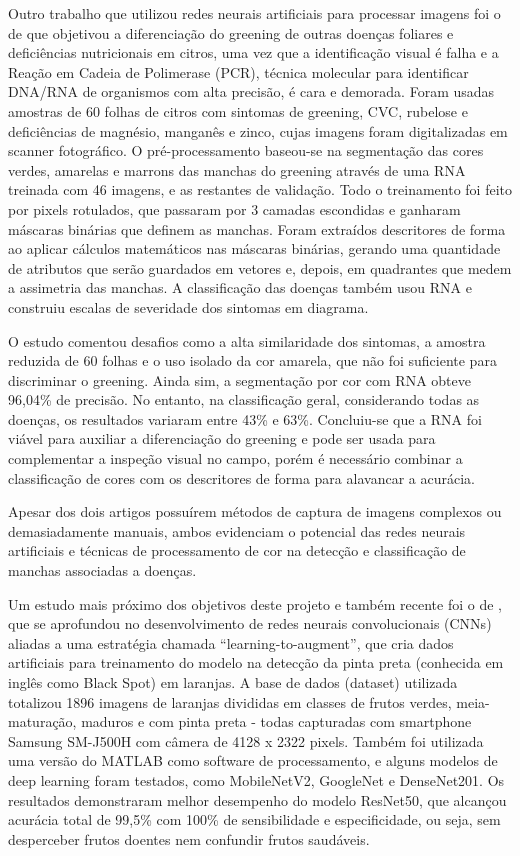 Outro trabalho que utilizou redes neurais artificiais para processar imagens foi o de \cite{Ribeiro2012} que objetivou a diferenciação do greening de outras doenças foliares e deficiências nutricionais em citros, uma vez que a identificação visual é falha e a Reação em Cadeia de Polimerase (PCR), técnica molecular para identificar DNA/RNA de organismos com alta precisão, é cara e demorada. Foram usadas amostras de 60 folhas de citros com sintomas de greening, CVC, rubelose e deficiências de magnésio, manganês e zinco, cujas imagens foram digitalizadas em scanner fotográfico. O pré-processamento baseou-se na segmentação das cores verdes, amarelas e marrons das manchas do greening através de uma RNA treinada com 46 imagens, e as restantes de validação. Todo o treinamento foi feito por pixels rotulados, que passaram por 3 camadas escondidas e ganharam máscaras binárias que definem as manchas. Foram extraídos descritores de forma ao aplicar cálculos matemáticos nas máscaras binárias, gerando uma quantidade de atributos que serão guardados em vetores e, depois, em quadrantes que medem a assimetria das manchas. A classificação das doenças também usou RNA e construiu escalas de severidade dos sintomas em diagrama. 

O estudo comentou desafios como a alta similaridade dos sintomas, a amostra reduzida de 60 folhas e o uso isolado da cor amarela, que não foi suficiente para discriminar o greening. Ainda sim, a segmentação por cor com RNA obteve 96,04\% de precisão. No entanto, na classificação geral, considerando todas as doenças, os resultados variaram entre 43\% e 63\%. Concluiu-se que a RNA foi viável para auxiliar a diferenciação do greening e pode ser usada para complementar a inspeção visual no campo, porém é necessário combinar a classificação de cores com os descritores de forma para alavancar a acurácia.

Apesar dos dois artigos possuírem métodos de captura de imagens complexos ou demasiadamente manuais, ambos evidenciam o potencial das redes neurais artificiais e técnicas de processamento de cor na detecção e classificação de manchas associadas a doenças. 

Um estudo mais próximo dos objetivos deste projeto e também recente foi o de \textcite{Momeny2022}, que se aprofundou no desenvolvimento de redes neurais convolucionais (CNNs) aliadas a uma estratégia chamada “learning-to-augment”, que cria dados artificiais para treinamento do modelo na detecção da pinta preta (conhecida em inglês como Black Spot) em laranjas. A base de dados (dataset) utilizada totalizou 1896 imagens de laranjas divididas em classes de frutos verdes, meia-maturação, maduros e com pinta preta - todas capturadas com smartphone Samsung SM-J500H com câmera de 4128 x 2322 pixels. Também foi utilizada uma versão do MATLAB como software de processamento, e alguns modelos de deep learning foram testados, como MobileNetV2, GoogleNet e DenseNet201. Os resultados demonstraram melhor desempenho do modelo ResNet50, que alcançou acurácia total de 99,5\% com 100\% de sensibilidade e especificidade, ou seja, sem desperceber frutos doentes nem confundir frutos saudáveis. 

